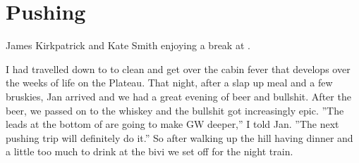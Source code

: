 \section{Pushing
}

    \begin{marginfigure}
\checkoddpage \ifoddpage \forcerectofloat \else \forceversofloat \fi
\centering
 \caption{James Kirkpatrick and Kate Smith enjoying a break at . }
 \label{quilt kal}
\end{marginfigure}

I had travelled down to  to clean and get over the cabin fever that
develops over the weeks of life on the Plateau. That night, after a slap
up meal and a few bruskies, Jan arrived and we had a great evening of
beer and bullshit. After the beer, we passed on to the whiskey and the
bullshit got increasingly epic. ''The leads at the bottom of  are going to make GW deeper,'' I told Jan. ''The next pushing trip
will definitely do it.'' So after walking up the hill having dinner and
a little too much to drink at the bivi we set off for the night train.

